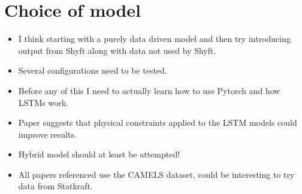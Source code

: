 \documentclass[a4paper,12pt,english]{article}
\begin{document}
\section*{Choice of model}
\begin{itemize}
\item I think starting with a purely data driven model and then try introducing output from Shyft along with data not used by Shyft.
\item Several configurations need to be tested.
\item Before any of this I need to actually learn how to use Pytorch and how LSTMs work.
\item Paper \cite{lstm_third_paper} suggests that physical constraints applied to the LSTM models could improve results.
\item Hybrid model should at least be attempted!
\item All papers referenced use the CAMELS dataset, could be interesting to try data from Statkraft.
\end{itemize}



\end{document}
